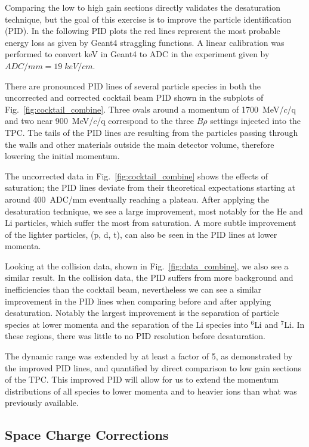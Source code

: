 Comparing the low to high gain sections directly validates the desaturation technique, but the goal  of this exercise is to improve the particle identification (PID). In the following PID plots the red lines represent the most probable energy loss as given by Geant4 straggling functions. A linear calibration was performed to convert keV in Geant4 to ADC in the experiment given by $ADC/mm = 19\;keV/cm$.

There are pronounced PID lines of several particle species in both the uncorrected and corrected cocktail beam PID shown in the subplots of Fig.~\ref{fig:cocktail_combine}. Three ovals around a momentum of 1700~MeV/$c$/q and two near 900~MeV/$c$/q correspond to the three $B\rho$ settings injected into the TPC. The tails of the PID lines are resulting from the particles passing through the walls and other materials outside the main detector volume, therefore lowering the initial momentum. 

The uncorrected data in Fig.~\ref{fig:cocktail_combine} shows the effects of saturation; the PID lines deviate from their theoretical expectations starting at around 400~ADC/mm eventually reaching a plateau. After applying the desaturation technique, we see a large improvement, most notably for the He and Li particles, which suffer the most from saturation. A more subtle improvement of the lighter particles, (p, d, t), can also be seen in the PID lines at lower momenta.

Looking at the collision data, shown in Fig.~\ref{fig:data_combine}, we also see a similar result. In the collision data, the PID suffers from more background and inefficiencies than the cocktail beam, nevertheless we can see a similar improvement in the PID lines when comparing before and after applying desaturation. Notably the largest improvement is the separation of particle species at lower momenta and the separation of the Li species into ${}^{6}$Li and ${}^{7}$Li. In these regions, there was little to no PID resolution before desaturation. 

The dynamic range was extended by at least a factor of 5, as demonstrated by the improved PID lines, and quantified by direct comparison to low gain sections of the TPC. This improved PID will allow for us to extend the momentum distributions of all species to lower momenta and to heavier ions than what was previously available. 


\subsection{Space Charge Corrections}
\label{sec:spacecharge}

